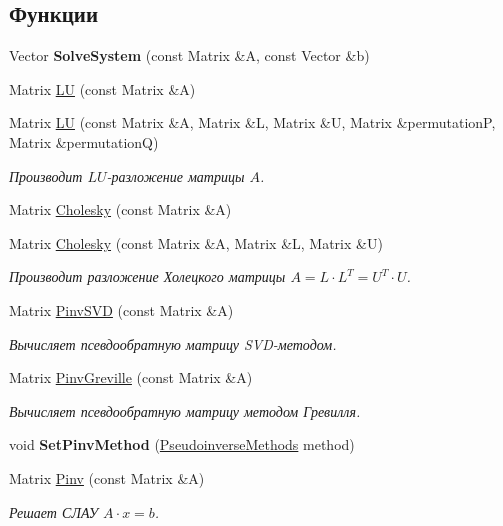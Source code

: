 \subsection*{Функции}
\begin{DoxyCompactItemize}
\item 
\hypertarget{namespace_math_1_1_lin_alg_ab6e559246eac7fcd1bb0ef18fc4657ee}{}\label{namespace_math_1_1_lin_alg_ab6e559246eac7fcd1bb0ef18fc4657ee} 
Vector {\bfseries Solve\+System} (const Matrix \&A, const Vector \&b)
\item 
Matrix \hyperlink{namespace_math_1_1_lin_alg_ad6053d7dea0e4d128cdcff0d8423708a}{LU} (const Matrix \&A)
\item 
Matrix \hyperlink{namespace_math_1_1_lin_alg_ad84a3dd8b243ffbc96f777aebafcbd8f}{LU} (const Matrix \&A, Matrix \&L, Matrix \&U, Matrix \&permutationP, Matrix \&permutationQ)
\begin{DoxyCompactList}\small\item\em Производит $LU$-\/разложение матрицы $A$. \end{DoxyCompactList}\item 
Matrix \hyperlink{namespace_math_1_1_lin_alg_a63d9cc41c4735dc5cefd2ec8880f432c}{Cholesky} (const Matrix \&A)
\item 
Matrix \hyperlink{namespace_math_1_1_lin_alg_a980590dcd2dcd5557b299e7b5dfc1946}{Cholesky} (const Matrix \&A, Matrix \&L, Matrix \&U)
\begin{DoxyCompactList}\small\item\em Производит разложение Холецкого матрицы $A = L \cdot L^{T} = U^{T} \cdot U$. \end{DoxyCompactList}\item 
Matrix \hyperlink{namespace_math_1_1_lin_alg_adaef1c5da9ab98ab6e106086383e3ed6}{Pinv\+S\+VD} (const Matrix \&A)
\begin{DoxyCompactList}\small\item\em Вычисляет псевдообратную матрицу S\+V\+D-\/методом. \end{DoxyCompactList}\item 
Matrix \hyperlink{namespace_math_1_1_lin_alg_a03abc1453c96f7898d89262f5278aefc}{Pinv\+Greville} (const Matrix \&A)
\begin{DoxyCompactList}\small\item\em Вычисляет псевдообратную матрицу методом Гревилля. \end{DoxyCompactList}\item 
\hypertarget{namespace_math_1_1_lin_alg_ad180bcdddb70c04adcd34f8915e2f500}{}\label{namespace_math_1_1_lin_alg_ad180bcdddb70c04adcd34f8915e2f500} 
void {\bfseries Set\+Pinv\+Method} (\hyperlink{namespace_math_1_1_lin_alg_a34ee452c5d64eeb10e1bb63cf887af17}{Pseudoinverse\+Methods} method)
\item 
Matrix \hyperlink{namespace_math_1_1_lin_alg_ab41fd1a41bd477364edce9085e8d6ac0}{Pinv} (const Matrix \&A)
\begin{DoxyCompactList}\small\item\em Решает СЛАУ $ A \cdot x = b$. \end{DoxyCompactList}\end{DoxyCompactItemize}
